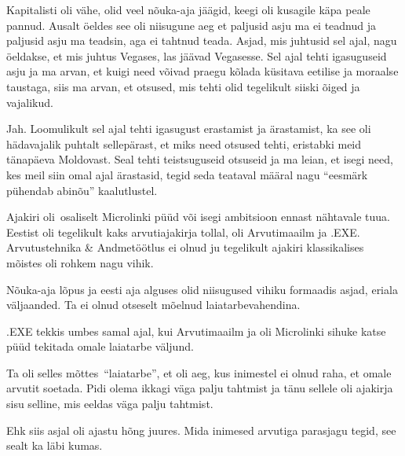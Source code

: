 Kapitalisti oli vähe, olid veel nõuka-aja jäägid, keegi oli kusagile käpa peale 
pannud. Ausalt öeldes see oli niisugune aeg et paljusid asju ma ei teadnud ja 
paljusid asju ma teadsin, aga ei tahtnud teada. Asjad, mis juhtusid sel ajal, 
nagu öeldakse, et mis juhtus Vegases, las jäävad Vegasesse. Sel ajal tehti 
igasuguseid asju ja ma arvan, et kuigi need võivad praegu kõlada küsitava 
eetilise ja moraalse taustaga, siis ma arvan, et otsused, mis tehti olid 
tegelikult siiski õiged ja vajalikud.


Jah. Loomulikult sel ajal tehti igasugust erastamist ja ärastamist, ka see oli 
hädavajalik puhtalt sellepärast, et miks need otsused tehti, eristabki meid 
tänapäeva  Moldovast. Seal tehti teistsuguseid otsuseid ja ma leian, et isegi 
need, kes meil siin omal ajal ärastasid, tegid seda teataval määral nagu 
\enquote{eesmärk pühendab abinõu} kaalutlustel.


Ajakiri oli osaliselt Microlinki püüd või isegi ambitsioon ennast nähtavale 
tuua.  Eestist oli tegelikult kaks arvutiajakirja tollal, oli 
Arvutimaailm ja .EXE. Arvutustehnika \& 
Andmetöötlus ei olnud ju tegelikult ajakiri klassikalises mõistes oli rohkem 
nagu vihik.

Nõuka-aja lõpus ja eesti  aja alguses olid niisugused vihiku formaadis asjad, 
eriala väljaanded. Ta ei olnud otseselt mõelnud laiatarbevahendina.

.EXE tekkis umbes samal ajal, kui Arvutimaailm ja oli Microlinki sihuke katse 
püüd tekitada omale laiatarbe väljund.


Ta oli selles mõttes \enquote{laiatarbe}, et oli aeg, kus inimestel ei olnud 
raha, et omale arvutit soetada. Pidi olema ikkagi väga palju tahtmist ja tänu 
sellele oli ajakirja sisu selline, mis eeldas väga palju tahtmist. 

Ehk siis asjal oli ajastu hõng juures. Mida inimesed arvutiga parasjagu tegid, 
see  sealt ka läbi kumas. 

